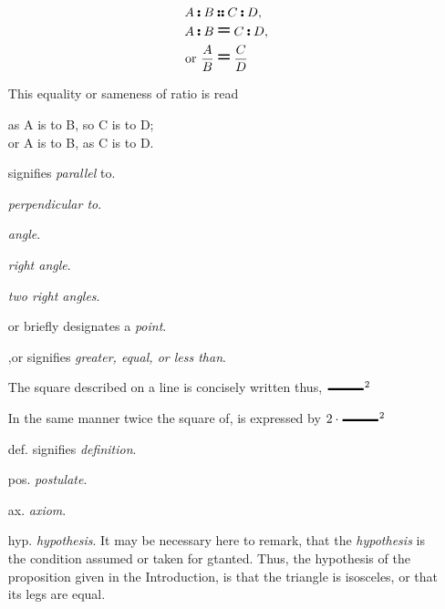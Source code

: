 \begin{itemize}
            \begin{align*}
            A \isto B &\as C \isto D,\\
            A \isto B &\equals C \isto D,\\
            \text{or } \frac{A}{B} &\equals \frac{C}{D}
            \end{align*}

            This equality or sameness of ratio is read 

            \begin{center}
            as A is to B, so C is to D; \\
            or A is to B, as C is to D.
            \end{center}

            \item[\plel] signifies \textit{parallel} to. 
            \item[\perpendicular]  \textit{perpendicular to}.
            \item[\acuteangle]  \textit{angle}.
            \item[\rightangle]  \textit{right angle}.
            \item[\rightangles] \textit{two right angles}. 
            \item[\trivertex or \vertex] briefly designates a \textit{point}.
            \item[\greater,\equals or \less] signifies \textit{greater, 
                equal, or less than}. 
            \item[] The square described on a line is concisely written 
                thus, ${\tikz[ultra thick,baseline=-0.5ex] \draw (0,0) -- 
                (1,0);}^{2}$
            \item[] In the same manner twice the square of, is expressed 
                by $2 \cdot{\tikz[ultra thick,baseline=-0.5ex] \draw (0,0) 
                -- (1,0);}^{2}$
            \item[def.] signifies \textit{definition}.
            \item[pos.]  \textit{postulate}.
            \item[ax.]  \textit{axiom}.
            \item[hyp.]  \textit{hypothesis}. It may be 
                necessary here to remark, that the \textit{hypothesis} is 
                the condition assumed or taken for gtanted. Thus, the 
                hypothesis of the proposition given in the Introduction, 
                is that the triangle is isosceles, or that its legs are 
                equal. 


\end{itemize}
